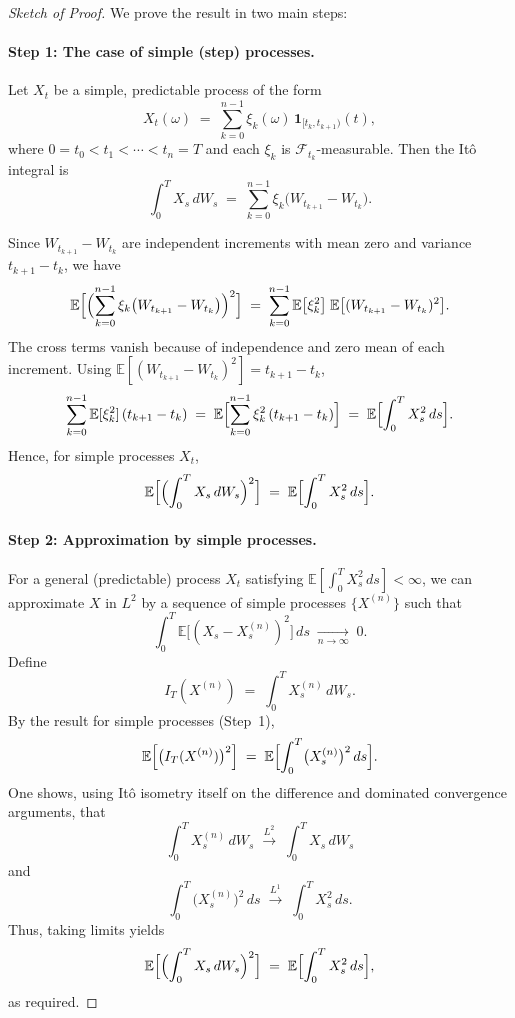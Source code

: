 \begin{proof}[Sketch of Proof]
We prove the result in two main steps:

\paragraph{Step 1: The case of simple (step) processes.}
Let $X_t$ be a simple, predictable process of the form
\[
  X_t(\omega) \;=\; \sum_{k=0}^{n-1} \xi_k(\omega)\,\mathbf{1}_{[t_k, t_{k+1})}(t),
\]
where $0 = t_0 < t_1 < \cdots < t_n = T$ and each $\xi_k$ is 
$\mathcal{F}_{t_k}$-measurable. Then the It\^o integral is
\[
  \int_0^T X_s \, dW_s 
  \;=\; \sum_{k=0}^{n-1} \xi_k \bigl(W_{t_{k+1}} - W_{t_k}\bigr).
\]

Since $W_{t_{k+1}} - W_{t_k}$ are independent increments with mean zero 
and variance $t_{k+1}-t_k$, we have
\[
  \mathbb{E}\Bigl[\Bigl(\sum_{k=0}^{n-1} 
    \xi_k \bigl(W_{t_{k+1}} - W_{t_k}\bigr)\Bigr)^2\Bigr]
  \;=\;
  \sum_{k=0}^{n-1} 
    \mathbb{E}\bigl[\xi_k^2\bigr]\;\mathbb{E}\bigl[(W_{t_{k+1}} - W_{t_k})^2\bigr].
\]
The cross terms vanish because of independence and zero mean of each increment. 
Using $\mathbb{E}[(W_{t_{k+1}} - W_{t_k})^2] = t_{k+1} - t_k$,
\[
  \sum_{k=0}^{n-1} \mathbb{E}[\xi_k^2]\,(t_{k+1} - t_k)
  \;=\;
  \mathbb{E}\Bigl[ \sum_{k=0}^{n-1} \xi_k^2\,(t_{k+1} - t_k) \Bigr]
  \;=\;
  \mathbb{E}\Bigl[\int_0^T X_s^2 \, ds\Bigr].
\]
Hence, for simple processes $X_t$,
\[
  \mathbb{E}\Bigl[\Bigl(\int_0^T X_s \, dW_s\Bigr)^2\Bigr]
  \;=\;
  \mathbb{E}\Bigl[\int_0^T X_s^2 \, ds\Bigr].
\]

\paragraph{Step 2: Approximation by simple processes.}
For a general (predictable) process $X_t$ satisfying 
$\mathbb{E}[\int_0^T X_s^2\,ds] < \infty$, we can approximate $X$ in $L^2$ 
by a sequence of simple processes $\{X^{(n)}\}$ such that
\[
   \int_0^T \mathbb{E}\bigl[(X_s - X_s^{(n)})^2\bigr]\,ds 
   \;\xrightarrow[n\to\infty]{}\; 0.
\]
Define 
\[
   I_T(X^{(n)}) \;=\; \int_0^T X_s^{(n)} \, dW_s.
\]
By the result for simple processes (Step~1),
\[
   \mathbb{E}\Bigl[\bigl(I_T(X^{(n)})\bigr)^2\Bigr]
   \;=\;
   \mathbb{E}\Bigl[\int_0^T \bigl(X_s^{(n)}\bigr)^2 \, ds\Bigr].
\]
One shows, using It\^o isometry itself on the difference and 
dominated convergence arguments, that
\[
   \int_0^T X_s^{(n)} \, dW_s 
   \;\xrightarrow{L^2}\;
   \int_0^T X_s \, dW_s
\]
and
\[
   \int_0^T \bigl(X_s^{(n)}\bigr)^2 \, ds
   \;\xrightarrow{L^1}\;
   \int_0^T X_s^2 \, ds.
\]
Thus, taking limits yields
\[
   \mathbb{E}\Bigl[\Bigl(\int_0^T X_s \, dW_s\Bigr)^2\Bigr]
   \;=\;
   \mathbb{E}\Bigl[\int_0^T X_s^2 \, ds\Bigr],
\]
as required.
\end{proof}

